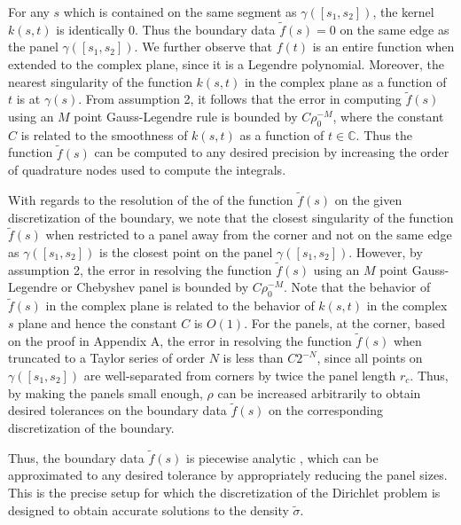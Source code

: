 \documentclass[12pt]{elsarticle}
\begin{document}
For any $s$ which is contained on the same segment as $\gamma([s_{1},s_{2}])$, the kernel $k(s,t)$ is identically $0$.
Thus the boundary data $\tilde{f}(s)=0$  on the same edge as the panel $\gamma([s_{1},s_{2}])$. 
We further observe that $f(t)$ is an entire function when extended to the complex plane, since it is a Legendre polynomial.
Moreover, the nearest singularity of the function $k(s,t)$ in the complex plane as a function of $t$ is at $\gamma(s)$.
From assumption 2, it follows that
the error in computing $\tilde{f}(s)$ using an $M$ point Gauss-Legendre rule is bounded by $C \rho_{0}^{-M}$, where
the constant $C$ is related to the smoothness of $k(s,t)$ as a function of $t \in \mathbb{C}.$
Thus the function $\tilde{f}(s)$ can be computed to any desired precision by increasing the order of quadrature nodes
used to compute the integrals. 


With regards to the resolution of the of the function $\tilde{f}(s)$ on the given discretization of the boundary, 
we note that the closest singularity of the function $\tilde{f}(s)$ when restricted to a panel away from the corner
and not on the same edge as $\gamma([s_{1},s_{2}])$ is the closest point on the panel $\gamma([s_{1},s_{2}])$. 
However, by assumption 2, the error in resolving the function $\tilde{f}(s)$ using an $M$ point Gauss-Legendre
or Chebyshev panel is bounded by $C \rho_{0}^{-M}$. Note that the behavior of $\tilde{f}(s)$ in the complex plane is related
to the behavior of $k(s,t)$ in the complex $s$ plane and hence the constant $C$ is $O(1)$.
For the panels, at the corner, based on the proof in Appendix A, the error in resolving the function $\tilde{f}(s)$ when
truncated to a Taylor series of order $N$ is less than $C 2^{-N}$, since all points on $\gamma([s_{1},s_{2}])$ are 
well-separated from corners by twice the panel length $r_{c}$. Thus, by making the panels small enough, $\rho$ can be increased arbitrarily to obtain desired tolerances on the boundary data $\tilde{f}(s)$ on the corresponding discretization of the boundary. 
 
 Thus, the boundary data $\tilde{f}(s)$ is piecewise analytic , which can be approximated to any desired tolerance by appropriately reducing the panel sizes. This is the precise setup for which the discretization of the Dirichlet problem is designed to obtain accurate solutions to the density $\tilde{\sigma}$. 
 
 
 
\end{document}
